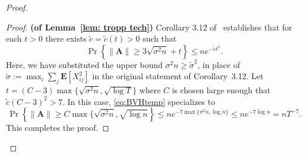 \documentclass[twoside,11pt]{article}
\newcommand{\E}{\mathbf{E}}
\DeclareMathOperator{\pr}{Pr}
\newcommand{\bs}{\boldsymbol}
\newcommand{\0}{\bs{0}}
\newcommand{\bra}[1]{\ensuremath{\left\{ #1 \right\}}} %
\begin{document}
{\begin{proof}
\begin{proof}
\newcommand{\ct}{\tilde c}
	{\bf (of Lemma~\ref{lem: tropp tech})}
	Corollary 3.12 of~\cite{bandeira2016sharp} establishes that for each $t>0$
	there exists $\tilde c = \tilde c(t) > 0$ such that
	\begin{equation} \label{eq:BVHtemp}
		\pr \bra{ \|\bs{A}\| \ge 3 \sqrt{\sigma^2 n} + t } \le n e^{-\ct t^2}.
	\end{equation}
	Here, we have substituted the upper bound $\sigma^2 n \ge \tilde \sigma^2$, in place of $\tilde \sigma:= \max_i \sum_{j} \E[X_{ij}^2]$ in the original statement of Corollary~3.12.
	Let $t = (C-3) \max\{ \sqrt{\sigma^2 n}, \sqrt{\log T} \}$ where $C$ is chosen large enough that $\ct 	(C-3)^2 > 7$.
	In this case, \eqref{eq:BVHtemp} specializes to
	\[
		\pr \bra{\|\bs{A}\| \ge C \max\{ \sqrt{\sigma^2 n}, \sqrt{\log n} }
		\le n e^{-7 \max\{\sigma^2 n, \log n\}} \le n e^{-7 \log n} = n T^{-7}.
	\]
	This completes the proof.
\end{proof}


\end{proof}}
\end{document}

